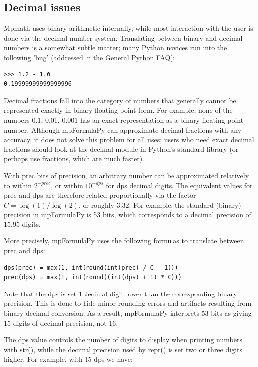 \subsection{Decimal issues}

Mpmath uses binary arithmetic internally, while most interaction with the user is done via the decimal number system. Translating between binary and decimal numbers is a somewhat subtle matter; many Python novices run into the following 'bug' (addressed in the General
Python FAQ):

\begin{lstlisting}
>>> 1.2 - 1.0
0.19999999999999996
\end{lstlisting}


Decimal fractions fall into the category of numbers that generally cannot be represented exactly in binary floating-point form. For example, none of the numbers 0.1, 0.01, 0.001 has an exact representation as a binary floating-point number. Although mpFormulaPy can
approximate decimal fractions with any accuracy, it does not solve this problem for all uses; users who need exact decimal fractions should look at the decimal module in Python's standard library (or perhaps use fractions, which are much faster).

\vpara
With prec bits of precision, an arbitrary number can be approximated relatively to within $2^{-prec}$, or within $10^{-dps}$ for dps decimal digits. The equivalent values for prec and dps are therefore related proportionally via the factor $C=\log(1)/\log(2)$, or roughly 3.32. For
example, the standard (binary) precision in mpFormulaPy is 53 bits, which corresponds to a decimal precision of 15.95 digits.

\vpara
More precisely, mpFormulaPy uses the following formulas to translate between prec and dps:

\begin{lstlisting}
dps(prec) = max(1, int(round(int(prec) / C - 1)))
prec(dps) = max(1, int(round((int(dps) + 1) * C)))
\end{lstlisting}

Note that the dps is set 1 decimal digit lower than the corresponding binary precision. This is done to hide minor rounding errors and artifacts resulting from binary-decimal conversion.
As a result, mpFormulaPy interprets 53 bits as giving 15 digits of decimal precision, not 16.

\vpara
The dps value controls the number of digits to display when printing numbers with str(),
while the decimal precision used by repr() is set two or three digits higher. For example,
with 15 dps we have:

